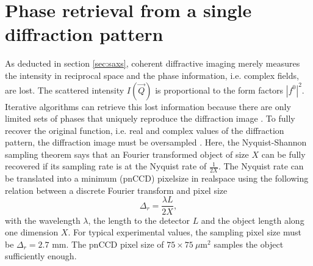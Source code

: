 \section{Phase retrieval from a single diffraction pattern}\label{sec:phase-retrieval}
As deducted in section \ref{sec:saxs}, coherent diffractive imaging merely measures the intensity in reciprocal space and the phase information, i.e. complex fields, are lost. The scattered intensity $I\left(\vec{Q}\right)$ is proportional to the form factors $\left|f^{0}\right|^{2}$. Iterative algorithms can retrieve this lost information because there are only limited sets of phases that uniquely reproduce the diffraction image \citep{Bruck-1979-OpticsCom,Bates-1981-Optik}. To fully recover the original function, i.e. real and complex values of the diffraction pattern, the diffraction image must be oversampled \citep{Sayre-1952-ActCryst}. Here, the Nyquist-Shannon sampling theorem says that an Fourier transformed object of size $X$ can be fully recovered if its sampling rate is at the Nyquist rate of $\frac{1}{2X}$. The Nyquist rate can be translated into a minimum (pnCCD) pixelsize in realspace using the following relation between a discrete Fourier transform and pixel size \citep{Williams-2010-NJP}
\begin{equation}
\Delta_{r} = \frac{\lambda L}{2 X},
\label{eq:disc-fourier-relation-pixelsize}
\end{equation}
with the wavelength $\lambda$, the length to the detector $L$ and the object length along one dimension $X$. For typical experimental values, the sampling pixel size must be $\Delta_{r} = 2.7$ mm. The pnCCD pixel size of $75 \times 75~\mu\text{m}^{2}$ samples the object sufficiently enough.
%
%
%
